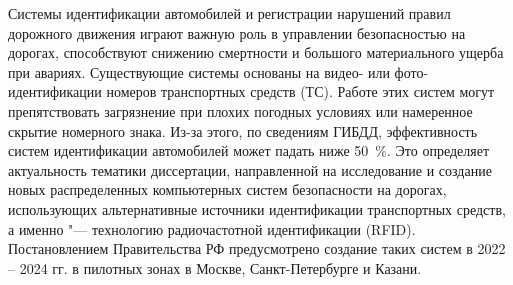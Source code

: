 




{\actuality} Системы идентификации автомобилей и регистрации нарушений правил дорожного движения играют важную роль в управлении безопасностью на дорогах, способствуют снижению смертности и большого материального ущерба при авариях. Существующие системы основаны на видео- или фото-идентификации номеров транспортных средств (ТС). Работе этих систем могут препятствовать загрязнение при плохих погодных условиях или намеренное скрытие номерного знака. Из-за этого, по сведениям ГИБДД, эффективность систем идентификации автомобилей может падать ниже 50~\%. Это определяет актуальность тематики диссертации, направленной на исследование и создание новых распределенных компьютерных систем безопасности на дорогах, использующих альтернативные источники идентификации транспортных средств, а именно "--- технологию радиочастотной идентификации (RFID). Постановлением Правительства РФ предусмотрено создание таких систем в 2022 -- 2024 гг. в пилотных зонах в Москве, Санкт-Петербурге и Казани.

